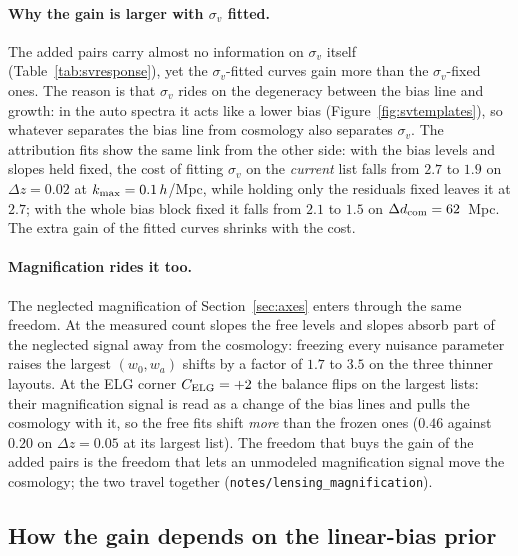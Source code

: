 \documentclass[11pt]{article}
\newcommand{\dcom}{$\Delta d_{\rm com} = 62$~Mpc}
\newcommand{\sv}{\sigma_v}
\newcommand{\us}{\_\allowbreak}
\begin{document}
\paragraph{Why the gain is larger with $\sv$ fitted.}
The added pairs carry almost no information on $\sv$ itself
(Table~\ref{tab:svresponse}), yet the $\sv$-fitted curves gain more
than the $\sv$-fixed ones.  The reason is that $\sv$ rides on the
degeneracy between the bias line and growth: in the auto spectra it
acts like a lower bias (Figure~\ref{fig:svtemplates}), so whatever
separates the bias line from cosmology also separates $\sv$.  The
attribution fits show the same link from the other side: with the
bias levels and slopes held fixed, the cost of fitting $\sv$ on the
\emph{current} list falls from $2.7$ to $1.9$ on $\Delta z = 0.02$
at $k_{\rm max} = 0.1\,h$/Mpc, while holding only the residuals
fixed leaves it at $2.7$; with the whole bias block fixed it falls
from $2.1$ to $1.5$ on \dcom{}.  The extra gain of the fitted
curves shrinks with the cost.

\paragraph{Magnification rides it too.}
The neglected magnification of Section~\ref{sec:axes} enters
through the same freedom.  At the measured count slopes the free
levels and slopes absorb part of the neglected signal away from the
cosmology: freezing every nuisance parameter raises the largest
$(w_0, w_a)$ shifts by a factor of $1.7$ to $3.5$ on the three
thinner layouts.  At the ELG corner $C_{\rm ELG} = +2$ the
balance flips on the largest lists: their magnification signal is
read as a change of the bias lines and pulls the cosmology with it,
so the free fits shift \emph{more} than the frozen ones ($0.46$
against $0.20$ on $\Delta z = 0.05$ at its largest list).  The
freedom that buys the gain of the added pairs is the freedom that
lets an unmodeled magnification signal move the cosmology; the two
travel together (\texttt{notes/lensing\us magnification}).

\subsection{How the gain depends on the linear-bias prior}
\label{sec:priorgain}
\end{document}
